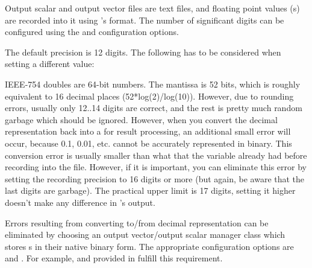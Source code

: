 Output scalar and output vector files are text files, and floating point
values (s) are recorded into it using 's
 format. The number of significant digits can be configured
using the  and 
configuration options.

The default precision is 12 digits. The following has to be considered when
setting a different value:

IEEE-754 doubles are 64-bit numbers. The mantissa is 52 bits, which is
roughly equivalent to 16 decimal places (52*log(2)/log(10)). However, due
to rounding errors, usually only 12..14 digits are correct, and the rest is
pretty much random garbage which should be ignored. However, when you
convert the decimal representation back into a  for result
processing, an additional small error will occur, because 0.1, 0.01, etc.
cannot be accurately represented in binary. This conversion error is
usually smaller than what that the  variable already had
before recording into the file. However, if it is important, you can
eliminate this error by setting the recording precision to 16 digits or
more (but again, be aware that the last digits are garbage). The practical
upper limit is 17 digits, setting it higher doesn't make any difference in
's output.

%
%
%

Errors resulting from converting to/from decimal representation can be
eliminated by choosing an output vector/output scalar manager class
which stores s in their native binary form.
The appropriate configuration options are 
and . For example,
 and 
provided in  fulfill this requirement.

